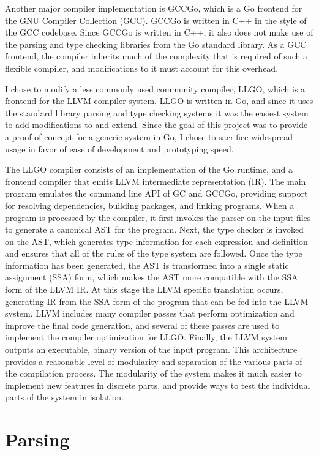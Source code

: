 \documentclass[letterpaper,twocolumn,11pt]{article}
\begin{document}
 Another major compiler implementation is GCCGo, which is a Go frontend for the GNU Compiler Collection (GCC). GCCGo is written in C++ in the style of the GCC codebase. Since GCCGo is written in C++, it also does not make use of the parsing and type checking libraries from the Go standard library. As a GCC frontend, the compiler inherits much of the complexity that is required of such a flexible compiler, and modifications to it must account for this overhead.

I chose to modify a less commonly used community compiler, LLGO, which is a frontend for the LLVM compiler system. LLGO is written in Go, and since it uses the standard library parsing and type checking systems it was the easiest system to add modifications to and extend. Since the goal of this project was to provide a proof of concept for a generic system in Go, I chose to sacrifice widespread usage in favor of ease of development and prototyping speed.

The LLGO compiler consists of an implementation of the Go runtime, and a frontend compiler that emits LLVM intermediate representation (IR). The main program emulates the command line API of GC and GCCGo, providing support for resolving dependencies, building packages, and linking programs. When a program is processed by the compiler, it first invokes the parser on the input files to generate a canonical AST for the program. Next, the type checker is invoked on the AST, which generates type information for each expression and definition and ensures that all of the rules of the type system are followed. Once the type information has been generated, the AST is transformed into a single static assignment (SSA) form, which makes the AST more compatible with the SSA form of the LLVM IR. At this stage the LLVM specific translation occurs, generating IR from the SSA form of the program that can be fed into the LLVM system. LLVM includes many compiler passes that perform optimization and improve the final code generation, and several of these passes are used to implement the compiler optimization for LLGO. Finally, the LLVM system outputs an executable, binary version of the input program. This architecture provides a reasonable level of modularity and separation of the various parts of the compilation process. The modularity of the system makes it much easier to implement new features in discrete parts, and provide ways to test the individual parts of the system in isolation.

\section{Parsing} \label{parsing}
\end{document}
